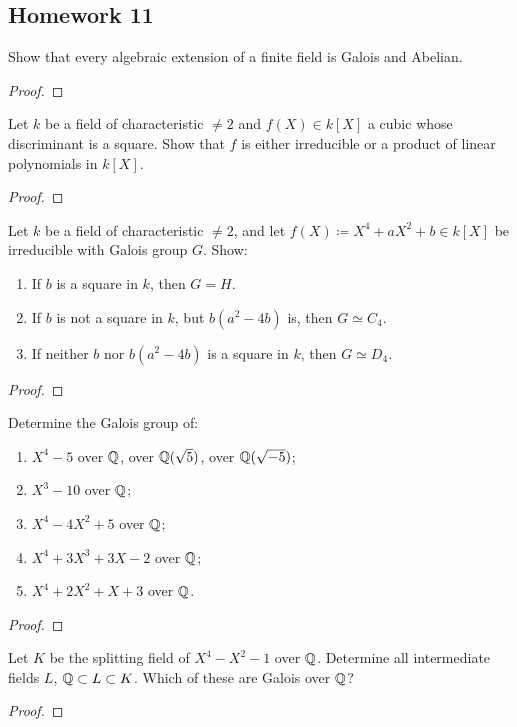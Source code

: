 \subsection{Homework 11}
\begin{problem}
  Show that every algebraic extension of a finite field is Galois and
  Abelian.
\end{problem}
\begin{proof}
\end{proof}

\begin{problem}
  Let $k$ be a field of characteristic $\neq 2$ and $f(X)\in k[X]$ a
  cubic whose discriminant is a square. Show that $f$ is either irreducible
  or a product of linear polynomials in $k[X]$.
\end{problem}
\begin{proof}
\end{proof}

\begin{problem}
  Let $k$ be a field of characteristic $\neq 2$, and let
  $f(X)\coloneq X^4+aX^2+b\in k[X]$ be irreducible with Galois group
  $G$. Show:
  \begin{enumerate}[label=(\roman*),noitemsep]
  \item If $b$ is a square in $k$, then $G=H$.
  \item If $b$ is not a square in $k$, but $b(a^2-4b)$ is, then
    $G\simeq C_4$.
  \item If neither $b$ nor $b(a^2-4b)$ is a square in $k$, then
    $G\simeq D_4$.
  \end{enumerate}
\end{problem}
\begin{proof}
\end{proof}

\begin{problem}
  Determine the Galois group of:
  \begin{enumerate}[label=(\alph*),noitemsep]
  \item $X^4-5$ over $\mathbb{Q}$, over $\mathbb{Q}(\sqrt{5})$, over $\mathbb{Q}(\sqrt{-5})$;
  \item $X^3-10$ over $\mathbb{Q}$;
  \item $X^4-4X^2+5$ over $\mathbb{Q}$;
  \item $X^4+3X^3+3X-2$ over $\mathbb{Q}$;
  \item $X^4+2X^2+X+3$ over $\mathbb{Q}$.
  \end{enumerate}
\end{problem}
\begin{proof}
\end{proof}

\begin{problem}
  Let $K$ be the splitting field of $X^4-X^2-1$ over $\mathbb{Q}$. Determine
  all intermediate fields $L$, $\mathbb{Q}\subset L\subset K$. Which of
  these are Galois over $\mathbb{Q}$?
\end{problem}
\begin{proof}
\end{proof}

